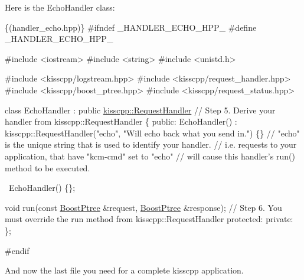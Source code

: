 Here is the Echo\-Handler class\-: 
\begin{DoxyCode}
\{(handler\_echo.hpp)\}
#ifndef \_HANDLER\_ECHO\_HPP\_
#define \_HANDLER\_ECHO\_HPP\_

#include <iostream>
#include <string>
#include <unistd.h>

#include <kisscpp/logstream.hpp>
#include <kisscpp/request\_handler.hpp>
#include <kisscpp/boost\_ptree.hpp>
#include <kisscpp/request\_status.hpp>

\textcolor{keyword}{class} EchoHandler : \textcolor{keyword}{public} \hyperlink{a00037}{kisscpp::RequestHandler}                           \textcolor{comment}{// Step
       5. Derive your handler from kisscpp::RequestHandler}
\{
  \textcolor{keyword}{public}:
    EchoHandler() :
      kisscpp::RequestHandler(\textcolor{stringliteral}{"echo"}, \textcolor{stringliteral}{"Will echo back what you send in."}) \{\} \textcolor{comment}{// "echo" is the unique string
       that is used to identify your handler.}
                                                                             \textcolor{comment}{// i.e. requests to your
       application, that have "kcm-cmd" set to "echo"}
                                                                             \textcolor{comment}{// will cause this handler's
       run() method to be executed.}

    ~EchoHandler() \{\};

    \textcolor{keywordtype}{void} run(\textcolor{keyword}{const} \hyperlink{a00048_ab36820650b8e0db36402aea80485633c}{BoostPtree} &request, \hyperlink{a00048_ab36820650b8e0db36402aea80485633c}{BoostPtree} &response);               \textcolor{comment}{// Step 6.
       You must override the run method from kisscpp::RequestHandler}
  \textcolor{keyword}{protected}:
  \textcolor{keyword}{private}:
\};

\textcolor{preprocessor}{#endif}
\end{DoxyCode}


And now the last file you need for a complete kisscpp application.


